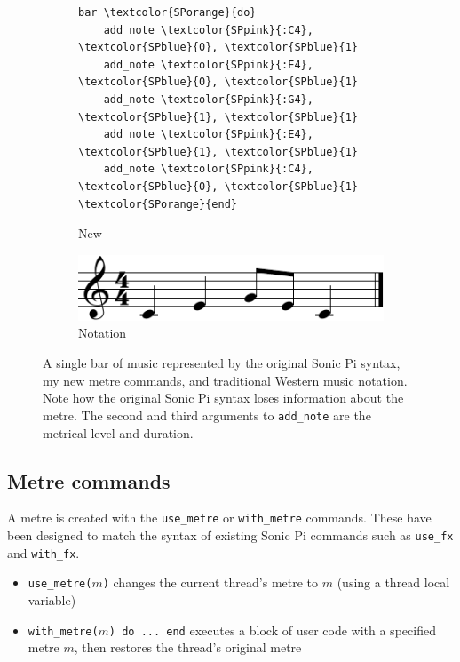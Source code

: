 \documentclass[12pt,twoside,openright]{report}
\begin{document}
\begin{figure}[ht]
\begin{subfigure}[b]{0.4\textwidth}
\begin{BVerbatim}[commandchars=\\\{\}]
bar \textcolor{SPorange}{do}
    add_note \textcolor{SPpink}{:C4}, \textcolor{SPblue}{0}, \textcolor{SPblue}{1}
    add_note \textcolor{SPpink}{:E4}, \textcolor{SPblue}{0}, \textcolor{SPblue}{1}
    add_note \textcolor{SPpink}{:G4}, \textcolor{SPblue}{1}, \textcolor{SPblue}{1}
    add_note \textcolor{SPpink}{:E4}, \textcolor{SPblue}{1}, \textcolor{SPblue}{1}
    add_note \textcolor{SPpink}{:C4}, \textcolor{SPblue}{0}, \textcolor{SPblue}{1}
\textcolor{SPorange}{end}
        \end{BVerbatim}
        \caption{New}
    \end{subfigure}
    \begin{subfigure}[b]{0.3\textwidth}
        \centering
        \includegraphics[width=\linewidth]{figures/sonic_pi_comparison.pdf}
        \caption{Notation}
    \end{subfigure}
    \cprotect\caption{A single bar of music represented by the original Sonic Pi syntax, my new metre commands, and traditional Western music notation. Note how the original Sonic Pi syntax loses information about the metre. The second and third arguments to \verb'add_note' are the metrical level and duration.}
    \label{fig:sonicpi_language_comparison}
\end{figure}


\subsection{Metre commands} \label{metre_commands}

A metre is created with the \verb'use_metre' or \verb'with_metre' commands. These have been
designed to match the syntax of existing Sonic Pi commands such as \verb'use_fx' and \verb'with_fx'.

\begin{itemize}
	\item \verb'use_metre('$m$\verb')' changes the current thread's metre to $m$ (using a thread local variable)
	\item \verb'with_metre('$m$\verb') do ... end' executes a block of user code with a
specified metre $m$, then restores the thread's original metre
\end{itemize}
\end{document}
